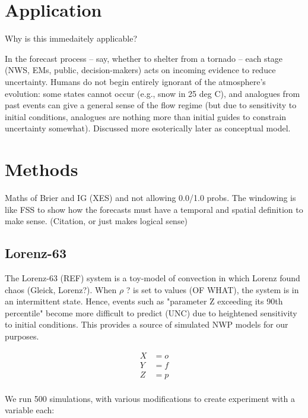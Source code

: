 \documentclass[draft]{ametsoc}
\begin{document}
\section{Application}
Why is this immedaitely applicable?

In the forecast process -- say, whether to shelter from a tornado -- each stage (NWS, EMs, public, decision-makers) acts on incoming evidence to reduce uncertainty. Humans do not begin entirely ignorant of the atmosphere's evolution: some states cannot occur (e.g., snow in 25 deg C), and analogues from past events can give a general sense of the flow regime (but due to sensitivity to initial conditions, analogues are nothing more than initial guides to constrain uncertainty somewhat). Discussed more esoterically later as conceptual model.

\section{Methods}
Maths of Brier and IG (XES) and not allowing 0.0/1.0 probs. The windowing is like FSS to show how the forecasts must have a temporal and spatial definition to make sense. (Citation, or just makes logical sense)

\subsection{Lorenz-63}
The Lorenz-63 (REF) system is a toy-model of convection in which Lorenz found chaos (Gleick, Lorenz?). When $\rho$ ? is set to values (OF WHAT), the system is in an intermittent state. Hence, events such as "parameter Z exceeding its 90th percentile" become more difficult to predict (UNC) due to heightened sensitivity to initial conditions. This provides a source of simulated NWP models for our purposes.

\begin{align}
    X &= o \\
    Y &= f \\
    Z &= p \\
\end{align}

We run 500 simulations, with various modifications to create experiment with a variable each:
\end{document}
